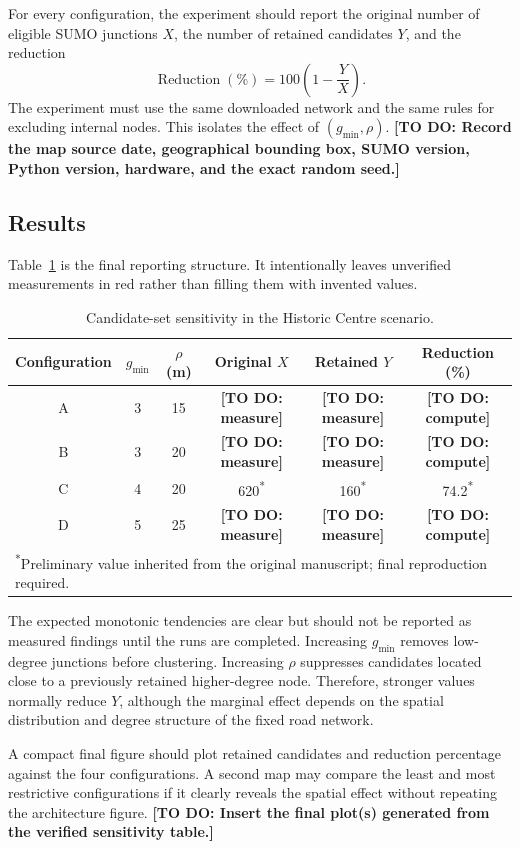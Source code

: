 \documentclass[engproc,proceedingpaper,submit,oneauthor]{Definitions/mdpi}
\newcommand{\todo}[1]{{\color{todored}\textbf{[TO DO: #1]}}}
\begin{document}
For every configuration, the experiment should report the original number of eligible SUMO junctions $X$, the number of retained candidates $Y$, and the reduction
\[
\operatorname{Reduction}(\%)=100\left(1-\frac{Y}{X}\right).
\]
The experiment must use the same downloaded network and the same rules for excluding internal nodes. This isolates the effect of $(g_{\min},\rho)$. \todo{Record the map source date, geographical bounding box, SUMO version, Python version, hardware, and the exact random seed.}

\subsection{Results}
Table~\ref{tab:sensitivity} is the final reporting structure. It intentionally leaves unverified measurements in red rather than filling them with invented values.

\begin{table}[H]
\centering
\caption{Candidate-set sensitivity in the Historic Centre scenario.}\label{tab:sensitivity}
\begin{tabular}{cccccc}
\toprule
Configuration & $g_{\min}$ & $\rho$ (m) & Original $X$ & Retained $Y$ & Reduction (\%)\\
\midrule
A & 3 & 15 & \todo{measure} & \todo{measure} & \todo{compute}\\
B & 3 & 20 & \todo{measure} & \todo{measure} & \todo{compute}\\
C & 4 & 20 & 620\textsuperscript{*} & 160\textsuperscript{*} & 74.2\textsuperscript{*}\\
D & 5 & 25 & \todo{measure} & \todo{measure} & \todo{compute}\\
\bottomrule
\multicolumn{6}{l}{\footnotesize \textsuperscript{*}Preliminary value inherited from the original manuscript; final reproduction required.}
\end{tabular}
\end{table}

The expected monotonic tendencies are clear but should not be reported as measured findings until the runs are completed. Increasing $g_{\min}$ removes low-degree junctions before clustering. Increasing $\rho$ suppresses candidates located close to a previously retained higher-degree node. Therefore, stronger values normally reduce $Y$, although the marginal effect depends on the spatial distribution and degree structure of the fixed road network.

A compact final figure should plot retained candidates and reduction percentage against the four configurations. A second map may compare the least and most restrictive configurations if it clearly reveals the spatial effect without repeating the architecture figure. \todo{Insert the final plot(s) generated from the verified sensitivity table.}
\end{document}
